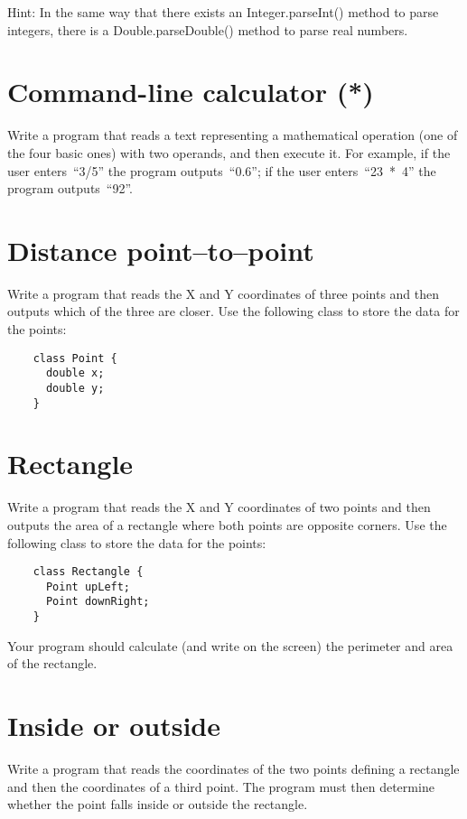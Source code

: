 \documentclass{article}
\begin{document}
Hint: In the same way that there exists an Integer.parseInt() method
to parse integers, there is a Double.parseDouble() method to parse
real numbers. 

\section{Command-line calculator (*)}
\label{sec:comm-line-calc}

Write a program that reads a text representing a mathematical
operation (one of the four basic ones) with two operands, and then
execute it. For example, if the user enters~``3/5'' the program
outputs~``0.6''; if the user enters~``23~*~4'' the program
outputs~``92''.

\section{Distance point--to--point}
\label{sec:distance-point-point}

Write a program that reads the X and Y coordinates of three points and
then outputs which of the three are closer. Use the following class
to store the data for the points: 

\begin{verbatim}
    class Point {
      double x;
      double y;
    }
\end{verbatim}

\section{Rectangle}
\label{sec:rectangle}

Write a program that reads the X and Y coordinates of two points and
then outputs the area of a rectangle where both points are opposite
corners. Use the following class
to store the data for the points: 

\begin{verbatim}
    class Rectangle {
      Point upLeft;
      Point downRight;
    }
\end{verbatim}

Your program should calculate (and write on the screen) the perimeter
and area of the rectangle. 

\section{Inside or outside}
\label{sec:inside-or-outside}

Write a program that reads the coordinates of the two points defining a
rectangle and then the coordinates of a third point. The program must
then determine whether the point falls inside or outside the
rectangle. 
\end{document}

